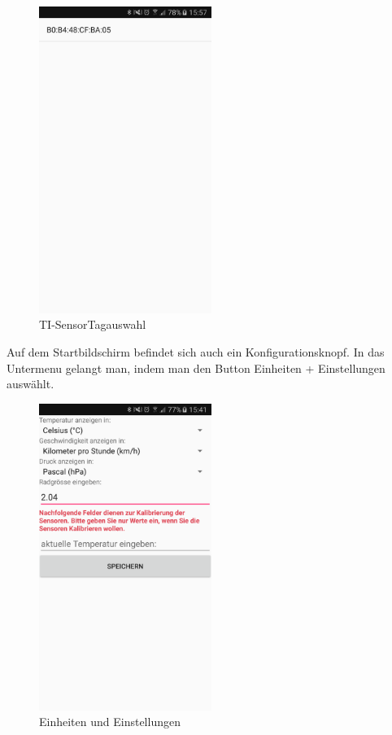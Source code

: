 \begin{figure}[ht]
    \includegraphics[width=0.5\textwidth]{4Resultate/imag/BLEAdresseAuswaehlen.png} 
    \caption{TI-SensorTagauswahl}
    \label{sensorauswahl}
\end{figure}

Auf dem Startbildschirm befindet sich auch ein Konfigurationsknopf. In das Untermenu gelangt man, indem man den Button \glqq Einheiten + Einstellungen \grqq auswählt.

\begin{figure}[ht]
    \includegraphics[width=0.5\textwidth]{4Resultate/imag/BLEEinheitenUndEinstellungenStart.png} 
    \caption{Einheiten und Einstellungen}
    \label{einheiten}
\end{figure}

